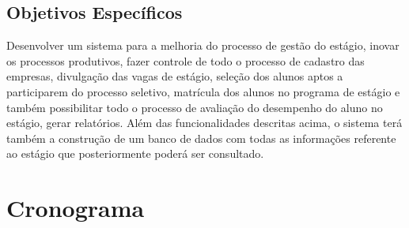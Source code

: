 \subsection{Objetivos Específicos}
\label{subsec:objetivosespificos}

Desenvolver um sistema para a melhoria do processo de gestão do estágio, inovar
os processos produtivos, fazer controle de todo o processo de cadastro das
empresas, divulgação das vagas de estágio, seleção dos alunos aptos a
participarem do processo seletivo, matrícula dos alunos no programa de estágio e 
também possibilitar todo o processo de avaliação do desempenho do aluno no
estágio, gerar relatórios.
Além das funcionalidades descritas acima, o sistema terá também a construção de
um banco de dados com todas as informações referente ao estágio que
posteriormente poderá ser consultado.

\section{Cronograma}
\label{sec:cronograma}

